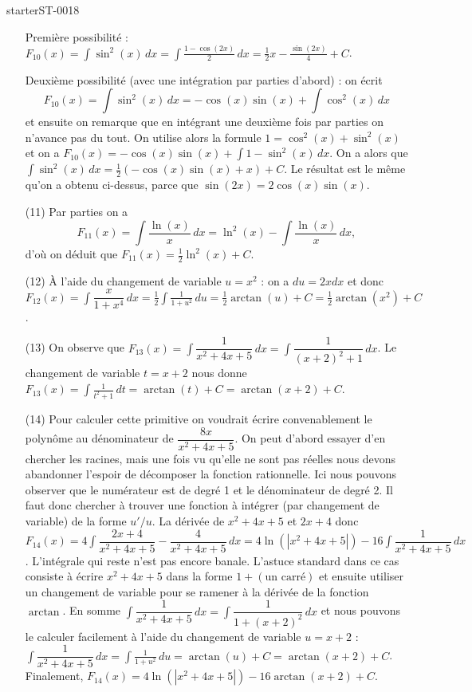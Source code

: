 \begin{corrige}{starterST-0018}
\begin{enumerate}
    Première possibilité : $F_{10}(x)=\displaystyle\int\sin^2 (x)\,dx = \int \frac{1-\cos(2x)}{2} \, dx = \frac{1}{2}x - \frac{\sin(2x)}{4} + C$. 

    Deuxième possibilité (avec une intégration par parties d'abord) : on écrit 
    \begin{equation}
    F_{10}(x)=\displaystyle\int\sin^2 (x)\,dx = -\cos(x)\sin(x) + \int \cos^2(x) \, dx 
    \end{equation}
    et ensuite on remarque que en intégrant une deuxième fois par parties on n'avance pas du tout. On utilise alors la formule $1 = \cos^2(x) + \sin^2(x)$ et on a  $F_{10}(x)=\displaystyle -\cos(x)\sin(x) + \int 1 - \sin^2(x) \, dx $.   On a alors que $\displaystyle\int\sin^2 (x)\,dx = \frac{1}{2} \left(-\cos(x)\sin(x)  + x\right) + C$. Le résultat est le m\^eme qu'on a obtenu ci-dessus, parce que $\sin(2x) = 2 \cos(x)\sin(x)$.
    \item[(11)]  Par parties on a  
    \[
    F_{11}(x)=\displaystyle\int\dfrac{\ln(x)}{x}\, dx = \ln^2(x) -\int\frac{\ln(x)}{x}\, dx,
    \]
d'où on déduit que $F_{11}(x)=\frac{1}{2} \ln^2(x) +C$.
  \item[(12)] À l'aide du changement de variable $ u = x^2$ : on a $du = 2x  dx$ et donc $F_{12}(x)=\displaystyle\int\dfrac{x}{1+x^4}\, dx = \frac{1}{2}\int \frac{1}{1 + u^2} \, du  = \frac{1}{2} \arctan(u) + C = \frac{1}{2} \arctan(x^2) + C  $. 
  \item[(13)] On observe que $F_{13}(x)=\displaystyle\int\dfrac{1}{x^2+4x+5}\, dx = \int\dfrac{1}{(x+2)^2+1}\, dx$. Le changement de variable $t = x+2$ nous donne  $\displaystyle F_{13}(x)=\int \frac{1}{t^2 + 1}\, dt = \arctan(t) + C = \arctan(x+2) + C$.
  \item[(14)] Pour calculer cette primitive on voudrait écrire convenablement le polyn\^ome au dénominateur de $\displaystyle \dfrac{8x}{x^2+4x+5}$. On peut d'abord essayer d'en chercher les racines, mais une fois vu qu'elle ne sont pas réelles  nous devons abandonner l'espoir de décomposer la fonction rationnelle. Ici nous  pouvons observer que le numérateur est de degré 1 et le dénominateur de degré 2. Il faut donc chercher à trouver une fonction à intégrer (par changement de variable) de la forme $u'/u$. La dérivée de $x^2+4x+5 $ et $2x + 4$ donc $F_{14}(x)=4 \displaystyle\int\dfrac{2x + 4}{x^2+4x+5} - \dfrac{4}{x^2+4x+5}\,dx = 4\ln\left(|x^2+4x+5|\right) -16 \int\dfrac{1}{x^2+4x+5} \, dx $. L'intégrale qui reste n'est pas encore banale. L'astuce standard  dans ce cas consiste à écrire $x^2+4x+5$ dans la forme $1 +(\text{un carré})$ et ensuite utiliser un changement de variable pour se ramener à la dérivée de la fonction $\arctan$. En somme $\displaystyle  \int\dfrac{1}{x^2+4x+5} \, dx  =  \int\dfrac{1}{1 + (x+2)^2} \, dx $ et nous pouvons le calculer facilement à l'aide du changement de variable $ u = x+2$ :  $\displaystyle  \int\dfrac{1}{x^2+4x+5} \, dx = \int \frac{1}{1+u^2} \, du = \arctan(u) + C = \arctan(x+2) + C $. Finalement, $F_{14}(x)=4\ln\left(|x^2+4x+5|\right) -16\arctan(x+2) + C $.

\end{enumerate}
\end{corrige}
